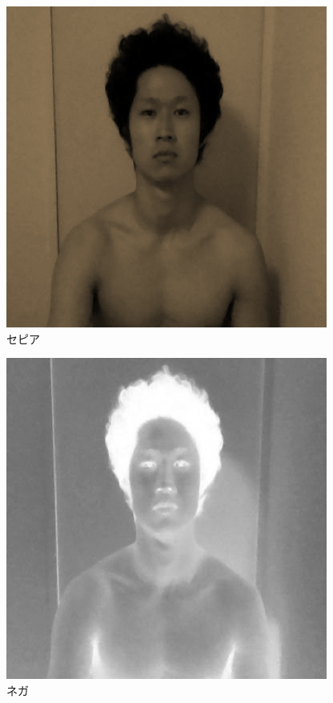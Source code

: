 \documentclass[10pt,a4paper]{jsarticle}
\begin{document}
\begin{figure}[h]
  \includegraphics[scale=1]{sutehagesepia.png}
  \caption{セピア}
  \label{fig:sutehage}
  
\end{figure}

\begin{figure}[h]
  \includegraphics[scale=1]{sutehagenega.png}
  \caption{ネガ}
  \label{fig:sutehage}
  
\end{figure}
\end{document}
